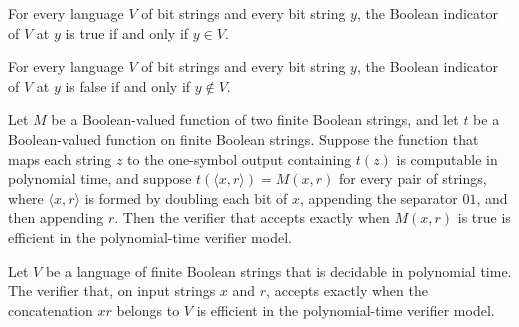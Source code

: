 \begin{theorem}
\label{Randomized.indicator_eq_true_iff}
\leanok
{}
For every language $V$ of bit strings and every bit string $y$, the Boolean indicator of
$V$ at $y$ is true if and only if $y\in V$.
\end{theorem}

\begin{theorem}
\label{Randomized.indicator_eq_false_iff}
\leanok
{}
For every language $V$ of bit strings and every bit string $y$, the Boolean indicator of
$V$ at $y$ is false if and only if $y\notin V$.
\end{theorem}

\begin{theorem}
\label{Randomized.eff_boolVerifier_of_test}
\leanok
{}
Let $M$ be a Boolean-valued function of two finite Boolean strings, and let $t$ be a
Boolean-valued function on finite Boolean strings. Suppose the function that maps each
string $z$ to the one-symbol output containing $t(z)$ is computable in polynomial time,
and suppose $t(\langle x,r\rangle)=M(x,r)$ for every pair of strings, where $\langle
x,r\rangle$ is formed by doubling each bit of $x$, appending the separator $01$, and
then appending $r$. Then the verifier that accepts exactly when $M(x,r)$ is true is
efficient in the polynomial-time verifier model.
\end{theorem}

\begin{theorem}
\label{Randomized.eff_append_mem}
\leanok
{}
Let $V$ be a language of finite Boolean strings that is decidable in polynomial time.
The verifier that, on input strings $x$ and $r$, accepts exactly when the concatenation
$x r$ belongs to $V$ is efficient in the polynomial-time verifier model.
\end{theorem}


